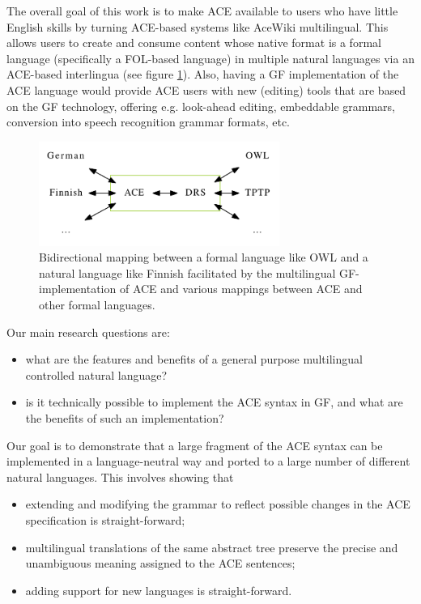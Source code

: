 \documentclass[a4paper]{article}
\begin{document}
The overall goal of this work is to make ACE available to users who have little
English skills by turning ACE-based systems like
AceWiki \cite{kuhn2010doctoralthesis} multilingual. This allows users
to create and consume content whose native format is a formal language
(specifically a FOL-based language) in multiple natural languages
via an ACE-based interlingua (see figure \ref{fig:languages}).
Also, having a GF implementation of the ACE language would
provide ACE users with new (editing) tools that are based on the GF technology,
offering e.g. look-ahead editing, embeddable grammars, conversion into
speech recognition grammar formats, etc.

\begin{figure}[ht]
\centering
\includegraphics[width=0.7\textwidth]{languages}
\caption[Languages]
{Bidirectional mapping between a formal language like OWL and a natural
language like Finnish facilitated by the multilingual GF-implementation of
ACE and various mappings between ACE and other formal languages.}
\label{fig:languages}
\end{figure}

Our main research questions are:

\begin{itemize}
\item what are the features and benefits of a general purpose multilingual
controlled natural language?
\item is it technically possible to implement the ACE syntax in GF,
and what are the benefits of such an implementation?
\end{itemize}

Our goal is to demonstrate that a large fragment of the ACE syntax
can be implemented in a language-neutral way and ported to a large number
of different natural languages. This involves showing that

\begin{itemize}
\item extending and modifying the grammar to reflect possible
changes in the ACE specification is straight-forward;
\item multilingual translations of the same abstract tree preserve the precise
and unambiguous meaning assigned to the ACE sentences;
\item adding support for new languages is straight-forward.
\end{itemize}
\end{document}
